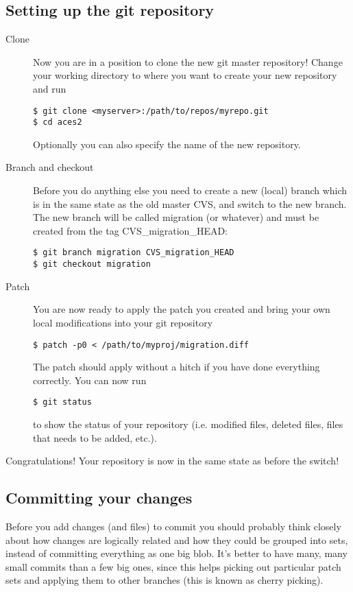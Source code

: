 \documentclass[a4paper,10pt]{article}
\begin{document}
\subsection{Setting up the git repository}
\begin{description}
\item[Clone] Now you are in a position to clone the new git master repository!
Change your working directory to where you want to create your new repository
and run
\begin{verbatim}
$ git clone <myserver>:/path/to/repos/myrepo.git
$ cd aces2 
\end{verbatim}
Optionally you can also specify the name of the new repository.
\item[Branch and checkout] 
Before you do anything else you need to create a new (local) branch which is
in the same state as the old master CVS, and switch to the new branch. The new
branch will be called migration (or whatever) and must be created from the tag
CVS\_migration\_HEAD:
\begin{verbatim}
$ git branch migration CVS_migration_HEAD
$ git checkout migration
\end{verbatim}
\item[Patch] You are now ready to apply the patch you created and bring your
own local modifications into your git repository
\begin{verbatim}
$ patch -p0 < /path/to/myproj/migration.diff
\end{verbatim}
The patch should apply without a hitch if you have done everything correctly.
You can now run 
\begin{verbatim}
$ git status
\end{verbatim}
to show the status of your repository (i.e. modified files, deleted files,
files that needs to be added, etc.).
\end{description}

Congratulations! Your repository is now in the same state as before the 
switch!

\subsection{Committing your changes}
Before you add changes (and files) to
commit you should probably think closely about how changes are logically
related and how they could be grouped into sets, instead of committing
everything as one big blob. It's better to have many, many small commits than
a few big ones, since this helps picking out particular patch sets and
applying them to other branches (this is known as cherry picking).
\end{document}
